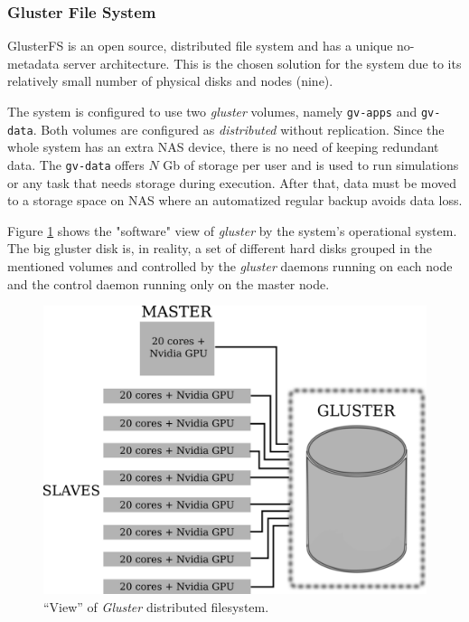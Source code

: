 \documentclass[twoside,a4paper,12pt,english]{inac19}
\begin{document}
\subsubsection{Gluster File System}

GlusterFS\cite{gluster} is an open source, distributed file system and has
a unique no-metadata server architecture. This is the chosen solution for the system due to its relatively
small number of physical disks and nodes (nine).

The system is configured to use two \textit{gluster} volumes, namely \texttt{gv-apps} and \texttt{gv-data}. Both volumes
are configured as \textit{distributed} without replication. Since the whole system has an extra NAS device, there is
no need of keeping redundant data. The \texttt{gv-data} offers $N$ Gb of storage per user and is used to run simulations or any task that needs storage during execution. After that, data must be moved to a storage space on NAS where an automatized regular backup avoids data loss.

Figure \ref{fig:cluster-gluster} shows the "software" view of \textit{gluster} by the system's operational system. The big 
gluster disk is, in reality, a set of different hard disks grouped in the mentioned volumes and controlled by the 
\textit{gluster} daemons running on each node and the control daemon running only on the master node.

\begin{figure}[h] %
  \centering\includegraphics[scale=0.7]{images/cluster-gluster.png}
  \caption{``View'' of \textit{Gluster} distributed filesystem.}
  \label{fig:cluster-gluster}
\end{figure}
\end{document}
